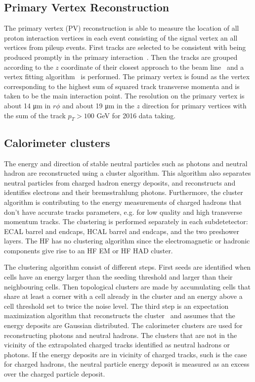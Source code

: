 \subsection{Primary Vertex Reconstruction}
The primary vertex (PV) reconstruction is able to measure the location of all proton interaction vertices in each event consisting of the signal vertex an all vertices from pileup events. First tracks are selected  to be consistent with being produced promptly in the primary interaction~\cite{Chatrchyan:1704291}. Then the tracks are grouped according to the $z$ coordinate of their closest approach to the beam line~\cite{726788} and a vertex fitting algorithm~\cite{Waltenberger:1166320} is performed. The primary vertex is found as the vertex corresponding to the highest sum of squared track transverse momenta and is taken to be the main interaction point. The resolution on the primary vertex is about 14 \si{ \micro \meter} in $r\phi$ and about 19 \si{ \micro \meter} in the $z$ direction for primary vertices with the sum of the track $p_T > 100$ \si{ \GeV} for 2016 data taking.

\subsection{Calorimeter clusters}
The energy and direction of stable neutral particles such as photons and neutral hadron are reconstructed using a cluster algorithm.  This algorithm also separates neutral particles from charged hadron energy deposits, 
and reconstructs and identifies electrons and their bremsstrahlung photons. Furthermore, the cluster algorithm is contributing to the energy measurements of charged hadrons that don't have accurate tracks parameters, e.g. for low quality and high transverse momentum tracks. The clustering is performed separately in each subdetetector: ECAL barrel and endcaps, HCAL barrel and endcaps, and the two preshower layers. The HF has no clustering algorithm since the electromagnetic or hadronic components give rise to an HF EM or HF HAD cluster. 

The clustering algorithm consist of different steps. First seeds are identified when cells have an energy larger than the seeding threshold and larger than their neighbouring cells. Then topological clusters are made by accumulating cells that share at least a corner with a cell already in the cluster and an energy above a cell threshold set to twice the noise level. The third step is an expectation maximization algorithm that reconstructs the cluster~\cite{CMS-PRF-14-001} and assumes that  the energy deposits are Gaussian distributed. The calorimeter clusters are used for reconstructing photons and neutral hadrons. The  clusters that are not in the vicinity of the extrapolated charged tracks identified as neutral hadrons or photons. If the energy deposits are in vicinity of charged tracks, such is the case for charged hadrons, the neutral particle energy deposit is measured as an excess over the charged particle deposit. %

